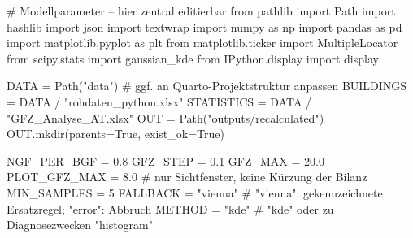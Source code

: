 \documentclass[
  ngerman,
  a4paper,
  DIV=11]{scrreprt}
\newenvironment{Shaded}{\begin{snugshade}}{\end{snugshade}}
\newcommand{\CommentTok}[1]{\textcolor[rgb]{0.37,0.37,0.37}{#1}}
\newcommand{\DecValTok}[1]{\textcolor[rgb]{0.68,0.00,0.00}{#1}}
\newcommand{\FloatTok}[1]{\textcolor[rgb]{0.68,0.00,0.00}{#1}}
\newcommand{\ImportTok}[1]{\textcolor[rgb]{0.00,0.46,0.62}{#1}}
\newcommand{\NormalTok}[1]{\textcolor[rgb]{0.00,0.23,0.31}{#1}}
\newcommand{\OperatorTok}[1]{\textcolor[rgb]{0.37,0.37,0.37}{#1}}
\newcommand{\StringTok}[1]{\textcolor[rgb]{0.13,0.47,0.30}{#1}}
\newcommand{\VariableTok}[1]{\textcolor[rgb]{0.07,0.07,0.07}{#1}}
\begin{document}
\begin{Shaded}
\begin{Highlighting}[]
\CommentTok{\# Modellparameter – hier zentral editierbar}
\ImportTok{from}\NormalTok{ pathlib }\ImportTok{import}\NormalTok{ Path}
\ImportTok{import}\NormalTok{ hashlib}
\ImportTok{import}\NormalTok{ json}
\ImportTok{import}\NormalTok{ textwrap}
\ImportTok{import}\NormalTok{ numpy }\ImportTok{as}\NormalTok{ np}
\ImportTok{import}\NormalTok{ pandas }\ImportTok{as}\NormalTok{ pd}
\ImportTok{import}\NormalTok{ matplotlib.pyplot }\ImportTok{as}\NormalTok{ plt}
\ImportTok{from}\NormalTok{ matplotlib.ticker }\ImportTok{import}\NormalTok{ MultipleLocator}
\ImportTok{from}\NormalTok{ scipy.stats }\ImportTok{import}\NormalTok{ gaussian\_kde}
\ImportTok{from}\NormalTok{ IPython.display }\ImportTok{import}\NormalTok{ display}

\NormalTok{DATA }\OperatorTok{=}\NormalTok{ Path(}\StringTok{"data"}\NormalTok{)                    }\CommentTok{\# ggf. an Quarto{-}Projektstruktur anpassen}
\NormalTok{BUILDINGS }\OperatorTok{=}\NormalTok{ DATA }\OperatorTok{/} \StringTok{"rohdaten\_python.xlsx"}
\NormalTok{STATISTICS }\OperatorTok{=}\NormalTok{ DATA }\OperatorTok{/} \StringTok{"GFZ\_Analyse\_AT.xlsx"}
\NormalTok{OUT }\OperatorTok{=}\NormalTok{ Path(}\StringTok{"outputs/recalculated"}\NormalTok{)}
\NormalTok{OUT.mkdir(parents}\OperatorTok{=}\VariableTok{True}\NormalTok{, exist\_ok}\OperatorTok{=}\VariableTok{True}\NormalTok{)}

\NormalTok{NGF\_PER\_BGF }\OperatorTok{=} \FloatTok{0.8}
\NormalTok{GFZ\_STEP }\OperatorTok{=} \FloatTok{0.1}
\NormalTok{GFZ\_MAX }\OperatorTok{=} \FloatTok{20.0}
\NormalTok{PLOT\_GFZ\_MAX }\OperatorTok{=} \FloatTok{8.0}                 \CommentTok{\# nur Sichtfenster, keine Kürzung der Bilanz}
\NormalTok{MIN\_SAMPLES }\OperatorTok{=} \DecValTok{5}
\NormalTok{FALLBACK }\OperatorTok{=} \StringTok{"vienna"}                \CommentTok{\# "vienna": gekennzeichnete Ersatzregel; "error": Abbruch}
\NormalTok{METHOD }\OperatorTok{=} \StringTok{"kde"}                    \CommentTok{\# "kde" oder zu Diagnosezwecken "histogram"}


\end{Highlighting}
\end{Shaded}
\end{document}
